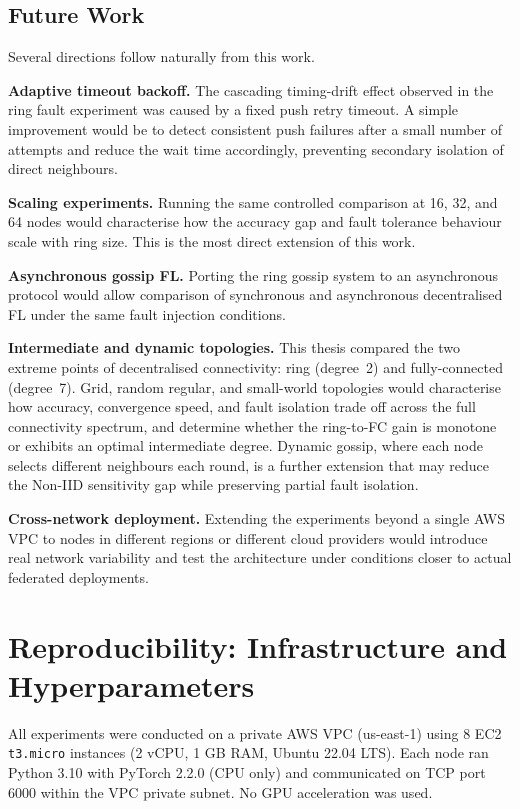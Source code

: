 \documentclass[12pt]{report}
\begin{document}
\section{Future Work}

Several directions follow naturally from this work.

\textbf{Adaptive timeout backoff.} The cascading timing-drift effect observed in
the ring fault experiment was caused by a fixed push retry timeout. A simple
improvement would be to detect consistent push failures after a small number of
attempts and reduce the wait time accordingly, preventing secondary isolation of
direct neighbours.

\textbf{Scaling experiments.} Running the same controlled comparison at 16, 32,
and 64 nodes would characterise how the accuracy gap and fault tolerance behaviour
scale with ring size. This is the most direct extension of this work.

\textbf{Asynchronous gossip FL.} Porting the ring gossip system to an
asynchronous protocol would allow comparison of synchronous and asynchronous
decentralised FL under the same fault injection conditions.

\textbf{Intermediate and dynamic topologies.} This thesis compared the two
extreme points of decentralised connectivity: ring (degree~2) and
fully-connected (degree~7). Grid, random regular, and small-world topologies
would characterise how accuracy, convergence speed, and fault isolation trade
off across the full connectivity spectrum, and determine whether the ring-to-FC
gain is monotone or exhibits an optimal intermediate degree. Dynamic gossip,
where each node selects different neighbours each round, is a further extension
that may reduce the Non-IID sensitivity gap while preserving partial fault
isolation.

\textbf{Cross-network deployment.} Extending the experiments beyond a single
AWS VPC to nodes in different regions or different cloud providers would introduce
real network variability and test the architecture under conditions closer to
actual federated deployments.

\appendix

\chapter{Reproducibility: Infrastructure and Hyperparameters}
\label{app:reproducibility}

All experiments were conducted on a private AWS VPC (us-east-1) using 8 EC2
\texttt{t3.micro} instances (2 vCPU, 1 GB RAM, Ubuntu 22.04 LTS). Each node
ran Python 3.10 with PyTorch 2.2.0 (CPU only) and communicated on TCP port 6000
within the VPC private subnet. No GPU acceleration was used.
\end{document}
